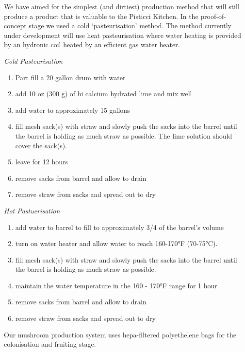 We have aimed for the simplest (and dirtiest) production method that
will still produce a product that is valuable to the Pisticci Kitchen.
In the proof-of-concept stage we used a cold `pasteurisation' method.
The method currently under development will use heat pasteurisation
where water heating is provided by an hydronic coil heated by an
efficient gas water heater.

\emph{Cold Pasteurisation}

\begin{enumerate}
\def\labelenumi{\arabic{enumi}.}
\itemsep1pt\parskip0pt
\item
  Part fill a 20 gallon drum with water
\item
  add 10 oz (300 g) of hi calcium hydrated lime and mix well
\item
  add water to approximately 15 gallons
\item
  fill mesh sack(s) with straw and slowly push the sacks into the barrel
  until the barrel is holding as much straw as possible. The lime
  solution should cover the sack(s).
\item
  leave for 12 hours
\item
  remove sacks from barrel and allow to drain
\item
  remove straw from sacks and spread out to dry
\end{enumerate}

\emph{Hot Pastuerisation}

\begin{enumerate}
\def\labelenumi{\arabic{enumi}.}
\itemsep1pt\parskip0pt
\item
  add water to barrel to fill to approximately 3/4 of the barrel's
  volume
\item
  turn on water heater and allow water to reach 160-170°F (70-75°C).
\item
  fill mesh sack(s) with straw and slowly push the sacks into the barrel
  until the barrel is holding as much straw as possible.
\item
  maintain the water temperature in the 160 - 170°F range for 1 hour
\item
  remove sacks from barrel and allow to drain
\item
  remove straw from sacks and spread out to dry
\end{enumerate}

Our mushroom production system uses hepa-filtered polyethelene bags for
the colonisation and fruiting stage.

